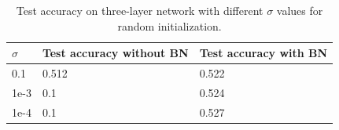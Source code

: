 \documentclass[a4paper]{article}
\begin{document}
\begin{table}[h]
	\centering
	\caption{Test accuracy on three-layer network with different $\sigma$ values for random initialization.}
	\label{tab:init}
	\begin{tabular}{|l|l|l|} 
		\hline
		$\sigma$ & Test accuracy without BN & Test accuracy with BN  \\ 
		\hline
		0.1                       & 0.512                    & 0.522                  \\ 
		\hline
		1e-3                      & 0.1                      & 0.524                  \\ 
		\hline
		1e-4                      & 0.1                      & 0.527                  \\
		\hline
	\end{tabular}
\end{table}
\end{document}
